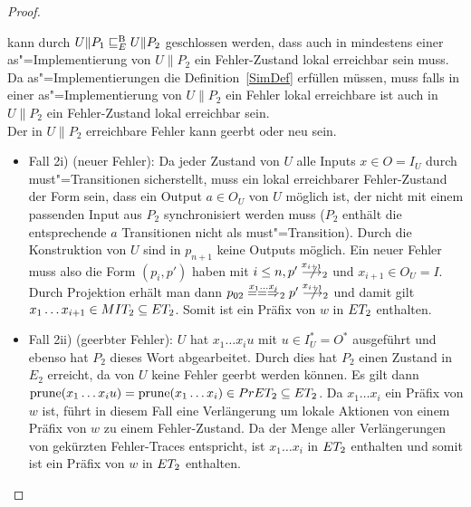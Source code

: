\begin{proof}
\begin{itemize}
      kann durch $U\|P_1 \sqsubseteq  _E^\mathrm{B} U\|P_2$ geschlossen werden, dass auch in
      mindestens einer as"=Implementierung von $U\|P_2$ ein Fehler-Zustand
      lokal erreichbar sein muss. Da as"=Implementierungen die
      Definition~\ref{SimDef} erfüllen müssen, muss falls in einer
      as"=Implementierung von $U\|P_2$ ein Fehler lokal erreichbare ist auch in
      $U\|P_2$ ein Fehler-Zustand lokal erreichbar sein.\\
      Der in $U\|P_2$ erreichbare Fehler kann geerbt oder neu sein.
      \begin{itemize}
        \item Fall 2i) (neuer Fehler): Da jeder Zustand von $U$ alle Inputs
          $x\in O=I_U$ durch must"=Transitionen sicherstellt, muss ein lokal
          erreichbarer Fehler-Zustand der Form sein, dass ein Output $a\in O_U$
          von $U$ möglich ist, der nicht mit einem passenden Input aus $P_2$
          synchronisiert werden muss ($P_2$ enthält die entsprechende $a$
          Transitionen nicht als must"=Transition). Durch die Konstruktion von
          $U$ sind in $p_{n+1}$ keine Outputs möglich. Ein neuer
          Fehler muss also die Form $(p_i,p')$ haben mit $i\leq
          n, p'\nmust[x_{i+1}]_2$ und $x_{i+1}\in O_U=I$. Durch Projektion
          erhält man dann $p_{02}\lweakmay[x_1\dots x_i]_2p'\nmust[x_{i+1}]_2$
          und damit gilt $x_1\dots x_{i+1}\in MIT _2\subseteq ET _2$. Somit
          ist ein Präfix von $w$ in $ET _2$ enthalten.
        \item Fall 2ii) (geerbter Fehler): $U$ hat $x_1\dots x_iu$ mit $u\in
          I_U^*=O^*$ ausgeführt und ebenso hat $P_2$ dieses Wort abgearbeitet.
          Durch dies hat $P_2$ einen Zustand  in $E_2$ erreicht, da von $U$
          keine Fehler geerbt werden können. Es gilt dann $\mathrm{prune} (x_1\dots
          x_iu) = \mathrm{prune} (x_1\dots x_i)\in PrET _2\subseteq ET _2$. Da
          $x_1\dots x_i$ ein Präfix von $w$ ist, führt in diesem Fall eine
          Verlängerung um lokale Aktionen von einem Präfix von $w$ zu einem
          Fehler-Zustand. Da \ET{} der Menge aller Verlängerungen von gekürzten
          Fehler-Traces entspricht, ist $x_1\dots x_i$ in $ET
          _2$ enthalten und somit ist ein Präfix von $w$ in $ET _2$ enthalten.
      \end{itemize}
  \end{itemize}


\end{proof}
